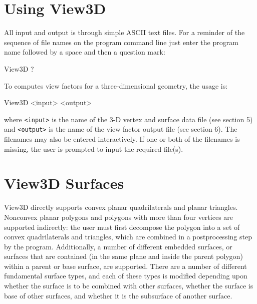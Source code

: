 \documentclass[10pt]{article}
\begin{document}
\section{Using View3D}
All input and output is through simple ASCII text files. For a reminder of the
sequence of file names on the program command line just enter the program name
followed by a space and then a question mark:

\begin{commandline}
View3D ?
\end{commandline}

\noindent
To computes view factors for a three-dimensional geometry, the usage is: 

\begin{commandline}
View3D <input> <output>
\end{commandline}

\noindent
where \verb|<input>| is the name of the 3-D vertex and surface data file (see
section 5) and \verb|<output>| is the name of the view factor output file (see
section 6).  The filenames may also be entered interactively.  If one or both
of the filenames is missing, the user is prompted to input the required 
file(s).

\section{View3D Surfaces}
View3D directly supports convex planar quadrilaterals and planar triangles. 
Nonconvex planar polygons and polygons with more than four vertices are
supported indirectly: the user must first decompose the polygon into a set of
convex quadrilaterals and triangles, which are combined in a postprocessing
step by the program.  Additionally, a number of different embedded surfaces, or
surfaces that are contained (in the same plane and inside the parent polygon)
within a parent or base surface, are supported.   There are a number of 
different fundamental surface types, and each of these types is modified
depending upon whether the surface is to be combined with other surfaces,
whether the surface is base of other surfaces, and whether it is the subsurface
of another surface.
\end{document}
